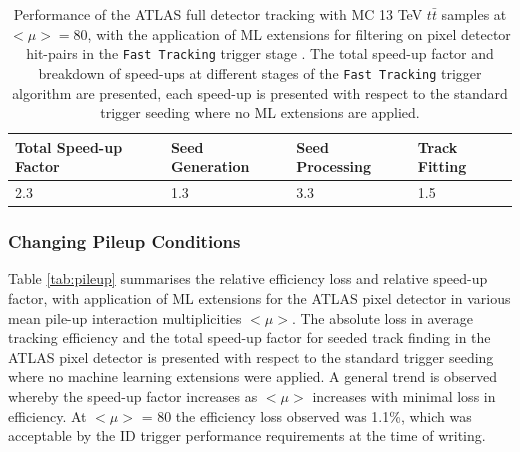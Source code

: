 \begin{table}[!htbp]
\caption{Performance of the ATLAS full detector tracking with MC 13 TeV $t\bar{t}$ samples at $<\mu> = 80$, with the application of ML extensions for filtering on pixel detector hit-pairs in the \texttt{Fast Tracking} trigger stage \cite{public-hlt}. The total speed-up factor and breakdown of speed-ups at different stages of the \texttt{Fast Tracking} trigger algorithm are presented, each speed-up is presented with respect to the standard trigger seeding where no ML extensions are applied.}
\begin{center}
\begin{tabular}{llll}
\toprule
Total Speed-up Factor & Seed Generation & Seed Processing & Track Fitting \\
\hline
2.3 & 1.3 & 3.3 & 1.5 \\ 
\bottomrule
\end{tabular}
\end{center}
\label{tab:cpu}
\end{table}

\subsubsection{Changing Pileup Conditions}

Table \ref{tab:pileup} summarises the relative efficiency loss and relative speed-up factor, with application of ML extensions for the ATLAS pixel detector in various mean pile-up interaction multiplicities $<\mu>$. The absolute loss in average tracking efficiency and the total speed-up factor for seeded track finding in the ATLAS pixel detector is presented with respect to the standard trigger seeding where no machine learning extensions were applied. A general trend is observed whereby the speed-up factor increases as $<\mu>$ increases with minimal loss in efficiency. At $<\mu>$ = 80 the efficiency loss observed was 1.1\%, which was acceptable by the ID trigger performance requirements at the time of writing.


